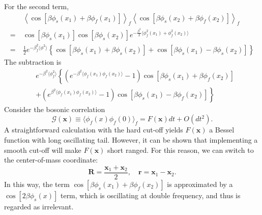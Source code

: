\documentclass[aps,prb,superscriptaddress,nofootinbib]{revtex4}
\begin{document}
For the second term,
\begin{equation}
\begin{aligned}
	&\ \left\langle \cos\left[\beta\phi_s(x_1)+\beta\phi_f(x_1)\right]\right\rangle_f \left\langle \cos\left[\beta\phi_s(x_2)+\beta\phi_f(x_2)\right]\right\rangle_f \\
	=&\ \cos[\beta\phi_s(x_1)]\cos[\beta\phi_s(x_2)] e^{-\frac{\beta^2}{2}\langle\phi_f^2(x_1)+\phi_f^2(x_2)\rangle} \\
	=&\ \frac{1}{2}e^{-\beta_f^2 \langle \phi^2\rangle} \left\{ \cos[\beta\phi_s(x_1)+\beta\phi_s(x_2)] + \cos[\beta\phi_s(x_1)-\beta\phi_s(x_2)] \right\}
\end{aligned}
\end{equation}
The subtraction is
\begin{equation}
\begin{aligned}
	& e^{-\beta^2\langle\phi_f^2\rangle} \left\{
		\left(e^{-\beta^2 \langle\phi_f(x_1)\phi_f(x_2)\rangle}-1 \right)\cos\left[\beta\phi_s(x_1) +\beta\phi_f(x_2)\right] \right. \\
	& + \left. \left(e^{\beta^2 \langle\phi_f(x_1)\phi_f(x_2)\rangle}-1 \right)\cos\left[\beta\phi_s(x_1) -\beta\phi_f(x_2)\right] \right\}
\end{aligned}
\end{equation}
Consider the bosonic correlation
\begin{equation}
	\mathcal G(\bm x) \equiv \langle \phi_f(x) \phi_f(0)\rangle_f = F(\bm x) dt + O(dt^2).
\end{equation}
A straightforward calculation with the hard cut-off yields $F(\bm x)$ a Bessel function with long oscillating tail.
However, it can be shown that implementing a smooth cut-off will make $F(\bm x)$ short ranged.
For this reason, we can switch to the center-of-mass coordinate:
\begin{equation}
	\bm R = \frac{\bm x_1 + \bm x_2}{2}, \quad \bm r = \bm x_1 - \bm x_2.
\end{equation}
In this way, the term $\cos\left[\beta\phi_s(x_1) +\beta\phi_f(x_2)\right]$ is approximated by a $\cos\left[2\beta\phi_s(x)\right]$ term, which is oscillating at double frequency, and thus is regarded as irrelevant.
\end{document}
